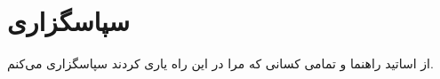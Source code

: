 \chapter*{سپاسگزاری}
از اساتید راهنما و تمامی کسانی که مرا در این راه یاری کردند سپاسگزاری می‌کنم.
\newpage
